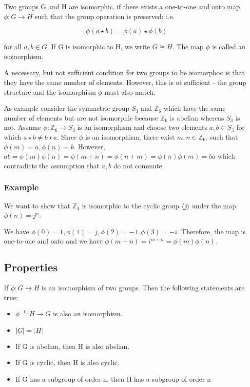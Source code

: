 

Two groups G and H are isomorphic, if there exists a one-to-one and onto
map $\phi:G \rightarrow H$ such that the group operation is preserved;
i.e.

\[
\phi(a \star b) = \phi(a) \star \phi(b)
\]

for all \(a,b \in G\). If G is isomorphic to H, we write \(G \cong H\).
The map $\phi$ is called an isomorphism.

A necessary, but not sufficient condition for two groups to be
isomorphoc is that they have the same number of elements. However, this
is ot sufficient - the group structure and the isomorphism \(\phi\) must
also match.

As example consider the symmetric group \(S_3\) and \(\mathbb{Z}_6\)
which have the same number of elements but are not isomorphic because
\(\mathbb{Z}_6\) is abelian whereas \(S_3\) is not. Assume
\(\phi: \mathbb{Z}_6 \rightarrow S_3\) is an isomorphism and choose two
elements \(a,b \in S_3\) for which \(a \star b \neq b \star a\). Since
\(\phi\) is an isomorphism, there exist \(m,n \in \mathbb{Z}_6\), such
that \(\phi(m) = a, \phi(n) = b\). However,
\(ab = \phi(m)\phi(n) = \phi(m+n) = \phi(n+m) = \phi(n) \phi(m) = b a\)
which contradicts the assumption that \(a,b\) do not commute.

\subsubsection{Example}\label{example}

We want to show that \(\mathbb{Z}_4\) is isomorphic to the cyclic group
\(\langle j \rangle\) under the map \(\phi(n) = j^n\).

We have \(\phi(0) = 1, \phi(1) = j, \phi(2) = -1, \phi(3) = -i\).
Therefore, the map is one-to-one and onto and we have
\(\phi(m+n) = i^{m+n} = \phi(m) \phi(n)\).

\subsection{Properties}\label{properties}

If \(\phi : G \rightarrow H\) is an isomorphism of two groups. Then the
following statements are true:

\begin{itemize}
\item
  \(\phi^{-1} : H \rightarrow G\) is also an isomorphism.
\item
  \(|G| = |H|\)
\item
  If G is abelian, then H is also abelian.
\item
  If G is cyclic, then H is also cyclic.
\item
  If G has a subgroup of order n, then H has a subgroup of order n
\end{itemize}

